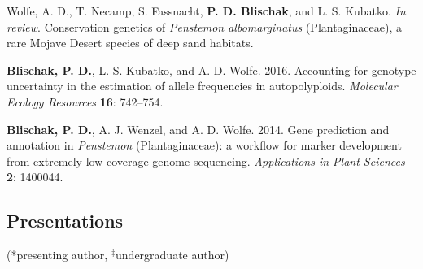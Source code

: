 \documentclass[]{article}
\begin{document}
\begin{etaremune}

\item
  Wolfe, A. D., T. Necamp, S. Fassnacht, \textbf{P. D. Blischak}, and L. S. Kubatko. \textit{In review}. 
  Conservation genetics of \textit{Penstemon albomarginatus} (Plantaginaceae), 
  a rare Mojave Desert species of deep sand habitats.

\item
  \textbf{Blischak, P. D.}, L. S. Kubatko, and A. D. Wolfe. 2016.
  Accounting for genotype uncertainty in the estimation of allele
  frequencies in autopolyploids. \emph{Molecular Ecology Resources} \textbf{16}: 
  742--754.
\item
  \textbf{Blischak, P. D.}, A. J. Wenzel, and A. D. Wolfe. 2014. Gene
  prediction and annotation in \textit{Penstemon} (Plantaginaceae): a
  workflow for marker development from extremely low-coverage genome
  sequencing. \emph{Applications in Plant Sciences} \textbf{2}: 1400044.
\end{etaremune}

\subsection{\texorpdfstring{\textbf{Presentations}}{Presentations}}\label{presentations}

(*presenting author, \(^{\ddagger}\)undergraduate author)
\end{document}
